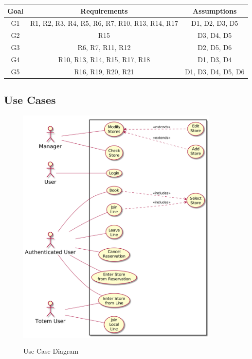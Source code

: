 \begin{center}
    \begin{tabular}{ |c||c|c| }
        \hline
        \textbf{Goal} & \textbf{Requirements} & \textbf{Assumptions} \\
        \hline
        G1 & R1, R2, R3, R4, R5, R6, R7, R10, R13, R14, R17 & D1, D2, D3, D5 \\ %
        \hline
        G2 & R15 & D3, D4, D5 \\ %
        \hline
        G3 & R6, R7, R11, R12 & D2, D5, D6\\ %
        \hline
        G4 & R10, R13, R14, R15, R17, R18 & D1, D3, D4 \\ %
        \hline
        G5 & R16, R19, R20, R21 & D1, D3, D4, D5, D6 \\ %
        \hline
    \end{tabular}
\end{center}

\subsection{Use Cases}


\begin{figure}[H]
    \centering
    \includegraphics[width=0.9\textwidth]{uml/usecase.png}
    \label{fig:user_case_diagram}
    \caption{Use Case Diagram}
\end{figure}


